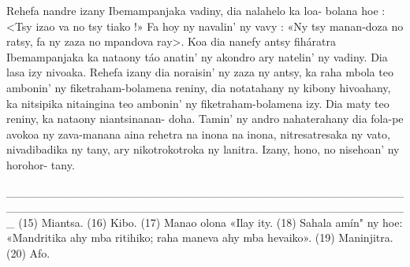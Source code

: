 Rehefa nandre izany Ibemampanjaka vadiny, dia nalahelo ka loa-
bolana hoe : <Tsy izao va no tsy tiako !» Fa hoy ny navalin' ny vavy : «Ny
tsy manan-doza no ratsy, fa ny zaza no mpandova ray>. Koa dia nanefy
antsy fiháratra Ibemampanjaka ka nataony táo anatin' ny akondro ary
natelin' ny vadiny. Dia lasa izy nivoaka. Rehefa izany dia noraisin' ny zaza
ny antsy, ka raha mbola teo ambonin' ny fiketraham-bolamena reniny, dia
notatahany ny kibony hivoahany, ka nitsipika nitaingina teo ambonin' ny
fiketraham-bolamena izy. Dia maty teo reniny, ka nataony niantsinanan-
doha. Tamin' ny andro nahaterahany dia fola-pe avokoa ny zava-manana
aina rehetra na inona na inona, nitresatresaka ny vato, nivadibadika ny
tany, ary nikotrokotroka ny lanitra. Izany, hono, no nisehoan' ny horohor-
tany.

_________________________________________________________________________________________________
(15) Miantsa. 
(16) Kibo. 
(17) Manao olona «Ilay ity. 
(18) Sahala amín" ny hoe: «Mandritika ahy mba ritihiko; raha maneva ahy mba hevaiko». 
(19) Maninjitra. 
(20) Afo.